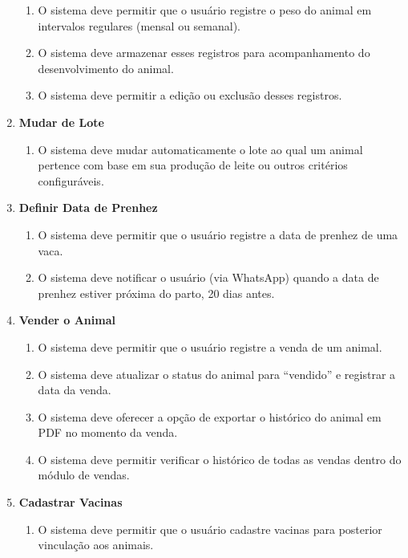 \documentclass[12pt, a4paper]{article}
\begin{document}
\begin{spacing}{1.5}
\begin{spacing}{1.5}
\begin{enumerate}[label=RF0\arabic{*}.]
    \begin{enumerate}[label=RF05.0\arabic{*}]
        \item O sistema deve permitir que o usuário registre o peso do animal em intervalos regulares (mensal ou semanal).
        \item O sistema deve armazenar esses registros para acompanhamento do desenvolvimento do animal.
        \item O sistema deve permitir a edição ou exclusão desses registros.
    \end{enumerate}
    \item \textbf{Mudar de Lote}
    \begin{enumerate}[label=RF06.0\arabic{*}]
        \item O sistema deve mudar automaticamente o lote ao qual um animal pertence com base em sua produção de leite ou outros critérios configuráveis.
    \end{enumerate}
    \item \textbf{Definir Data de Prenhez}
    \begin{enumerate}[label=RF07.0\arabic{*}]
        \item O sistema deve permitir que o usuário registre a data de prenhez de uma vaca.
        \item O sistema deve notificar o usuário (via WhatsApp) quando a data de prenhez estiver próxima do parto, 20 dias antes.
    \end{enumerate}
    \item \textbf{Vender o Animal}
    \begin{enumerate}[label=RF8.0\arabic{*}]
        \item O sistema deve permitir que o usuário registre a venda de um animal.
        \item O sistema deve atualizar o status do animal para ``vendido'' e registrar a data da venda.
        \item O sistema deve oferecer a opção de exportar o histórico do animal em PDF no momento da venda.
        \item O sistema deve permitir verificar o histórico de todas as vendas dentro do módulo de vendas.
    \end{enumerate}
    \item \textbf{Cadastrar Vacinas}
    \begin{enumerate}[label=RF9.0\arabic{*}]
        \item O sistema deve permitir que o usuário cadastre vacinas para posterior vinculação aos animais.

\end{enumerate}
\end{enumerate}
\end{spacing}
\end{spacing}
\end{document}
